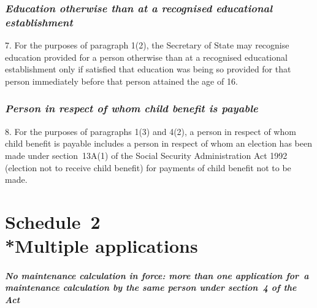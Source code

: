 \documentclass[12pt,a4paper]{article}
\begin{document}

\section*{\itshape Education otherwise than at a recognised educational establishment}

7.  For the purposes of paragraph 1(2), the Secretary of State may recognise education provided for a person otherwise than at a recognised educational establishment only if satisfied that education was being so provided for that person immediately before that person attained the age of 16.


\section*{\itshape Person in respect of whom child benefit is payable}

8.  For the purposes of paragraphs 1(3) and 4(2), a person in respect of whom child benefit is payable includes a person in respect of whom an election has been made under section~13A(1) of the Social Security Administration Act 1992 (election not to receive child benefit) for payments of child benefit not to be made.


\part[Schedule~2 --- Multiple applications]{Schedule~2\\*Multiple applications}

\renewcommand\parthead{--- Schedule~2}

\subsection*{\itshape No maintenance calculation in force: more than one application for~a maintenance calculation by the same person under section~4 
of the Act}
\end{document}
